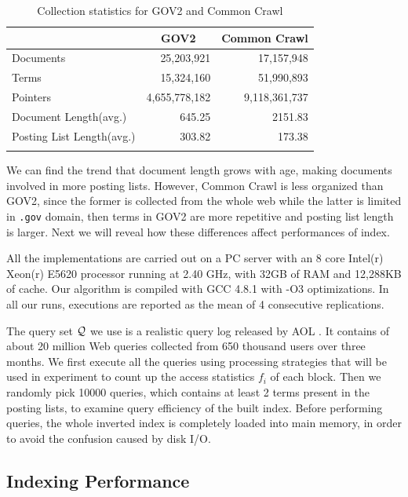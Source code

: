 \documentclass{sig-alternate-05-2015}
\begin{document}
\begin{table}
	\centering
	\caption{Collection statistics for GOV2 and Common Crawl}
	\renewcommand{\arraystretch}{1.0}
	\begin{tabular}{l*{2}{r}}
		\toprule
		& \multicolumn{1}{c}{GOV2} & \multicolumn{1}{c}{Common Crawl} \\
		\midrule
		Documents & 25,203,921 & 17,157,948 \\
		Terms & 15,324,160 & 51,990,893 \\
		Pointers & 4,655,778,182 & 9,118,361,737 \\
		Document Length(avg.) & 645.25 & 2151.83 \\
		Posting List Length(avg.) & 303.82 & 173.38 \\
		\bottomrule
		\label{tab: collection statistics}
	\end{tabular}
\end{table}

We can find the trend that document length grows with age, making documents involved in more posting lists.
However, Common Crawl is less organized than GOV2, since the former is collected from the whole web while the latter is limited in \texttt{.gov} domain, then terms in GOV2 are more repetitive and posting list length is larger.
Next we will reveal how these differences affect performances of index.

All the implementations are carried out on a PC server with an 8 core Intel(r) Xeon(r) E5620 processor running at 2.40 GHz, with 32GB of RAM and 12,288KB of cache. Our algorithm is compiled with GCC 4.8.1 with -O3 optimizations. In all our runs, executions are reported as the mean of 4 consecutive replications.

The query set $ \cal Q $ we use is a realistic query log released by AOL \cite{pass2006picture}.
It contains of about 20 million Web queries collected from 650 thousand users over three months.
We first execute all the queries using processing strategies that will be used in experiment to count up the access statistics $ f_i $ of each block.
Then we randomly pick 10000 queries, which contains at least 2 terms present in the posting lists, to examine query efficiency of the built index.
Before performing queries, the whole inverted index is completely loaded into main memory, in order to avoid the confusion caused by disk I/O.

\subsection{Indexing Performance}
\end{document}
